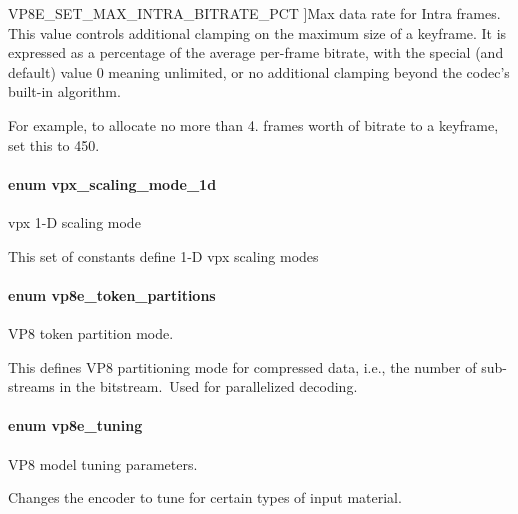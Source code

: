 \begin{Desc}
\begin{description}
{\hypertarget{group__vp8__encoder_gga6deae3d561c838952552c3d3756322eca09c69ff4a3aabdb307d4f24027dfc4c1}{\-V\-P8\-E\-\_\-\-S\-E\-T\-\_\-\-M\-A\-X\-\_\-\-I\-N\-T\-R\-A\-\_\-\-B\-I\-T\-R\-A\-T\-E\-\_\-\-P\-C\-T}\label{group__vp8__encoder_gga6deae3d561c838952552c3d3756322eca09c69ff4a3aabdb307d4f24027dfc4c1}
}]\-Max data rate for \-Intra frames. \-This value controls additional clamping on the maximum size of a keyframe. \-It is expressed as a percentage of the average per-\/frame bitrate, with the special (and default) value 0 meaning unlimited, or no additional clamping beyond the codec's built-\/in algorithm.

\-For example, to allocate no more than 4. frames worth of bitrate to a keyframe, set this to 450. \end{description}
\end{Desc}

\hypertarget{group__vp8__encoder_ga70071b1bb6cac9a1ef0ea3d8362ff94f}{
\paragraph[{vpx\-\_\-scaling\-\_\-mode\-\_\-1d}]{\setlength{\rightskip}{0pt plus 5cm}enum {\bf vpx\-\_\-scaling\-\_\-mode\-\_\-1d}}}\label{group__vp8__encoder_ga70071b1bb6cac9a1ef0ea3d8362ff94f}


vpx 1-\/\-D scaling mode 

\-This set of constants define 1-\/\-D vpx scaling modes \hypertarget{group__vp8__encoder_ga5f7508ba3fb453b47f62313ed0b864d2}{
\paragraph[{vp8e\-\_\-token\-\_\-partitions}]{\setlength{\rightskip}{0pt plus 5cm}enum {\bf vp8e\-\_\-token\-\_\-partitions}}}\label{group__vp8__encoder_ga5f7508ba3fb453b47f62313ed0b864d2}


\-V\-P8 token partition mode. 

\-This defines \-V\-P8 partitioning mode for compressed data, i.\-e., the number of sub-\/streams in the bitstream.\- \-Used for parallelized decoding. \hypertarget{group__vp8__encoder_ga371dbc29054b3d46364af996ad42ab94}{
\paragraph[{vp8e\-\_\-tuning}]{\setlength{\rightskip}{0pt plus 5cm}enum {\bf vp8e\-\_\-tuning}}}\label{group__vp8__encoder_ga371dbc29054b3d46364af996ad42ab94}


\-V\-P8 model tuning parameters. 

\-Changes the encoder to tune for certain types of input material. 